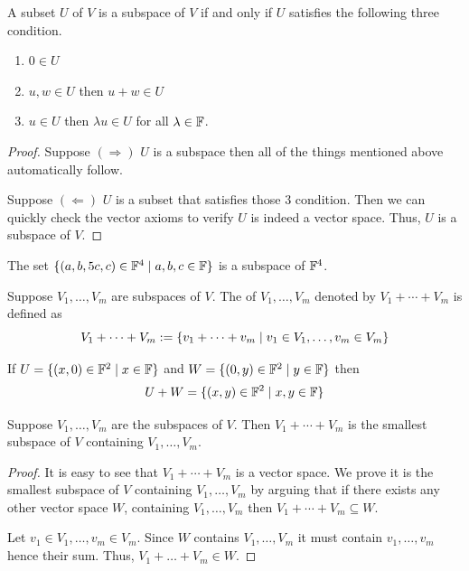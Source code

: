 \begin{theorem}
    \label{thm:subgroup criterion}
    A subset $U$ of $V$ is a subspace of $V$ if and only if $U$ satisfies the following three condition.
    \begin{enumerate}
        \item $0 \in U$
        \item $u,w \in U$ then $u+w \in U$
        \item $u \in U$ then $\lambda u \in U$ for all $\lambda \in \mathbb{F}$.
    \end{enumerate}
\end{theorem}
\begin{proof}
    Suppose $(\Rightarrow)$ $U$ is a subspace then all of the things mentioned above automatically follow.
    
    Suppose $(\Leftarrow)$ $U$ is a subset that satisfies those $3$ condition. Then we can quickly check the vector axioms to verify
    $U$ is indeed a vector space. Thus, $U$ is a subspace of $V$.
\end{proof}

\begin{example}
    The set $\{(a,b,5c,c) \in \mathbb{F}^4 \mid a,b,c \in \mathbb{F}\}$ is a subspace of $\mathbb{F}^4$.
\end{example}
\begin{definition}
    Suppose $V_1,\ldots,V_m$ are subspaces of $V$. The  of $V_1,\ldots, V_m$ denoted by $V_1+\cdots+V_m$ is 
    defined as
    \[ V_1 + \cdots + V_m := \{v_1 + \cdots + v_m \mid v_1 \in V_1,\ldots,v_m \in V_m\} \] 
\end{definition}

\begin{example}
    If $U = \{(x,0) \in \mathbb{F}^2 \mid x \in \mathbb{F} \}$ and $W=\{(0,y) \in \mathbb{F}^2 \mid y \in \mathbb{F}\}$ then
    \[ U+W = \{(x,y) \in \mathbb{F}^2 \mid x,y \in \mathbb{F}\} \]
\end{example}

\begin{theorem}
    \label{thm:direct sum is the smallest subspace}
    Suppose $V_1,\ldots,V_m$ are the subspaces of $V$. Then $V_1 + \cdots + V_m$ is the smallest subspace of $V$ containing 
    $V_1,\ldots,V_m$.
\end{theorem}

\begin{proof}
    It is easy to see that $V_1 + \cdots + V_m$ is a vector space. We prove it is the smallest subspace of $V$ containing $V_1,\ldots,V_m$
    by arguing that if there exists any other vector space $W$, containing $V_1,\ldots,V_m$ then $V_1+\cdots + V_m \subseteq W$. 

    Let $v_1 \in V_1,\ldots,v_m \in V_m$. Since $W$ contains $V_1,\ldots,V_m$ it must contain $v_1,\ldots,v_m$ hence their sum.
    Thus, $V_1+\ldots+V_m \in W$.
\end{proof}

